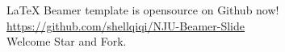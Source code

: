 \documentclass[10pt,aspectratio=43,mathserif]{beamer}
\renewcommand{\small}{\fontsize{8pt}{9.6pt}\selectfont}
\begin{document}
\begin{frame}
\begin{columns}
        \centering
        {
            \small
            \LaTeX{} Beamer template is opensource on Github now! \\[0.5em]
            \url{https://github.com/shellqiqi/NJU-Beamer-Slide} \\[0.5em]
            Welcome Star and Fork.
        }

    \end{columns}
\end{frame}
\end{document}

